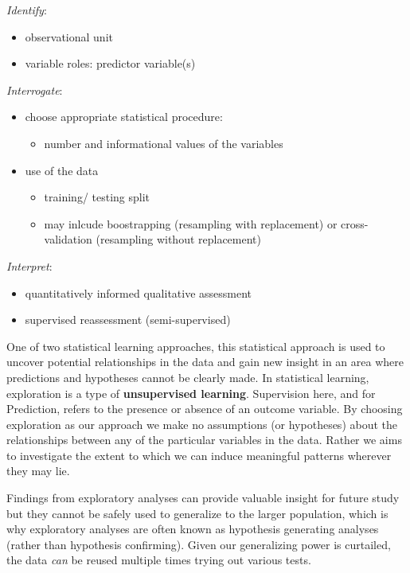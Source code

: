 \documentclass[
]{article}
\providecommand{\tightlist}{%
  \setlength{\itemsep}{0pt}\setlength{\parskip}{0pt}}
\begin{document}
\emph{Identify}:

\begin{itemize}
\tightlist
\item
  observational unit
\item
  variable roles: predictor variable(s)
\end{itemize}

\emph{Interrogate}:

\begin{itemize}
\tightlist
\item
  choose appropriate statistical procedure:

  \begin{itemize}
  \tightlist
  \item
    number and informational values of the variables
  \end{itemize}
\item
  use of the data

  \begin{itemize}
  \tightlist
  \item
    training/ testing split
  \item
    may inlcude boostrapping (resampling with replacement) or cross-validation (resampling without replacement)
  \end{itemize}
\end{itemize}

\emph{Interpret}:

\begin{itemize}
\tightlist
\item
  quantitatively informed qualitative assessment
\item
  supervised reassessment (semi-supervised)
\end{itemize}

One of two statistical learning approaches, this statistical approach is used to uncover potential relationships in the data and gain new insight in an area where predictions and hypotheses cannot be clearly made. In statistical learning, exploration is a type of \textbf{unsupervised learning}. Supervision here, and for Prediction, refers to the presence or absence of an outcome variable. By choosing exploration as our approach we make no assumptions (or hypotheses) about the relationships between any of the particular variables in the data. Rather we aims to investigate the extent to which we can induce meaningful patterns wherever they may lie.

Findings from exploratory analyses can provide valuable insight for future study but they cannot be safely used to generalize to the larger population, which is why exploratory analyses are often known as hypothesis generating analyses (rather than hypothesis confirming). Given our generalizing power is curtailed, the data \emph{can} be reused multiple times trying out various tests.
\end{document}

